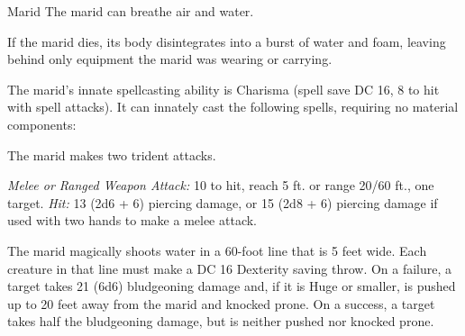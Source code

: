 \documentclass[10pt,a4paper,twoside,bg=print,twocolumn,openany,nodeprecatedcode]{dndbook}
\begin{document}
\begin{DndMonster}[float=t]{Marid}
\DndMonsterBasics[
armor-class = {17 (natural armor)},
hit-points = {\DndDice{17d10 + 136}},
speed = {30 ft., fly 60 ft., swim 90 ft.}
]
\DndMonsterAbilityScores[
 str = 22,
 dex = 12,
 con = 26,
 int = 18,
 wis = 17,
 cha = 18
]
\DndMonsterDetails[
saving-throws = {Dex +5, Wis +7, Cha +8},
damage-resistances = {acid, cold, lightning},
senses = {blindsight 30 ft., darkvision 120 ft., passive perception 13},
languages = {Aquan},
challenge = 11,
]
The marid can breathe air and water.

If the marid dies, its body disintegrates into a burst of water and foam, leaving behind only equipment the marid was wearing or carrying.

The marid's innate spellcasting ability is Charisma (spell save DC 16, 8 to hit with spell attacks). It can innately cast the following spells, requiring no material components:
\begin{DndMonsterSpells}
\end{DndMonsterSpells}
The marid makes two trident attacks.

\textsl{Melee or Ranged Weapon Attack:} 10 to hit, reach 5 ft. or range 20/60 ft., one target. \textsl{Hit:} 13 (2d6 + 6) piercing damage, or 15 (2d8 + 6) piercing damage if used with two hands to make a melee attack.

The marid magically shoots water in a 60-foot line that is 5 feet wide. Each creature in that line must make a DC 16 Dexterity saving throw. On a failure, a target takes 21 (6d6) bludgeoning damage and, if it is Huge or smaller, is pushed up to 20 feet away from the marid and knocked prone. On a success, a target takes half the bludgeoning damage, but is neither pushed nor knocked prone.

\end{DndMonster}
\end{document}
